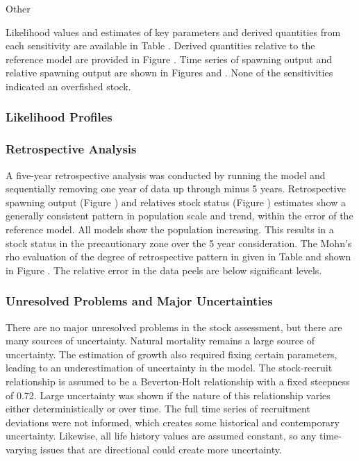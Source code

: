 \documentclass[
]{scrartcl}
\begin{document}
Other

Likelihood values and estimates of key parameters and derived quantities
from each sensitivity are available in Table . Derived quantities
relative to the reference model are provided in Figure . Time series of
spawning output and relative spawning output are shown in Figures and .
None of the sensitivities indicated an overfished stock.

\subsubsection{Likelihood Profiles}\label{likelihood-profiles}

\subsubsection{Retrospective Analysis}\label{retrospective-analysis}

A five-year retrospective analysis was conducted by running the model
and sequentially removing one year of data up through minus 5 years.
Retrospective spawning output (Figure ) and relatives stock status
(Figure ) estimates show a generally consistent pattern in population
scale and trend, within the error of the reference model. All models
show the population increasing. This results in a stock status in the
precautionary zone over the 5 year consideration. The Mohn's rho
evaluation of the degree of retrospective pattern in given in Table and
shown in Figure . The relative error in the data peels are below
significant levels.

\subsubsection{Unresolved Problems and Major
Uncertainties}\label{unresolved-problems-and-major-uncertainties-1}

There are no major unresolved problems in the stock assessment, but
there are many sources of uncertainty. Natural mortality remains a large
source of uncertainty. The estimation of growth also required fixing
certain parameters, leading to an underestimation of uncertainty in the
model. The stock-recruit relationship is assumed to be a Beverton-Holt
relationship with a fixed steepness of 0.72. Large uncertainty was shown
if the nature of this relationship varies either deterministically or
over time. The full time series of recruitment deviations were not
informed, which creates some historical and contemporary uncertainty.
Likewise, all life history values are assumed constant, so any
time-varying issues that are directional could create more uncertainty.
\end{document}
